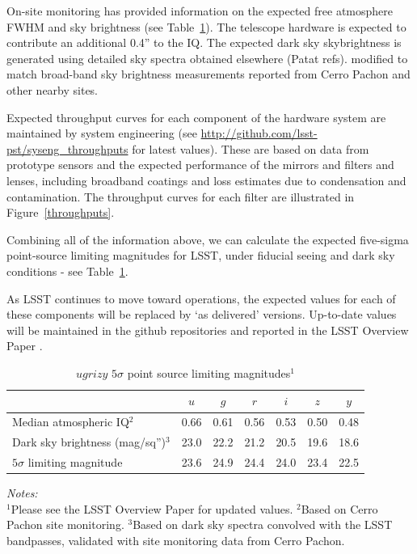 \documentclass{iau}
\begin{document}
On-site monitoring has provided information on the expected free
atmosphere FWHM and sky brightness (see Table~\ref{table2}). The
telescope hardware is expected to contribute an additional 0.4'' to
the IQ. The expected dark sky skybrightness is generated using
detailed sky spectra obtained elsewhere (Patat refs). modified to
match broad-band sky brightness measurements reported from Cerro
Pachon and other nearby sites.

Expected throughput curves for each component of the hardware system
are maintained by system engineering (see
\url{http://github.com/lsst-pst/syseng_throughputs} for latest
values).  These are based on data from prototype sensors and the
expected performance of the mirrors and filters and lenses, including
broadband coatings and loss estimates due to condensation and
contamination. The throughput curves for each filter are illustrated
in Figure~\ref{throughputs}.

Combining all of the information above, we can calculate the
expected five-sigma point-source limiting magnitudes for LSST, under
fiducial seeing and dark sky conditions - see Table~\ref{table2}.

As LSST continues to move toward operations, the expected values for each
of these components will be replaced by `as delivered'
versions. Up-to-date values will be maintained in the github
repositories and reported in the LSST Overview Paper \cite{overviewpaper}.

\begin{table}[tbh]
\begin{center}
\caption{$ugrizy$ $5\sigma$ point source limiting magnitudes$^1$}
\label{table2}
 {\scriptsize
  \begin{tabular}{|l|c|c|c|c|c|c|}\hline
 & $u$ & $g$ & $r$ & $i$ & $z$ & $y$ \\ \hline
Median atmospheric IQ$^2$  & 0.66 & 0.61 & 0.56 & 0.53 & 0.50 & 0.48 \\
    \hline
Dark sky brightness (mag/sq'')$^3$ & 23.0 & 22.2 &  21.2 & 20.5 & 19.6 & 18.6
    \\ \hline
$5\sigma$ limiting magnitude & 23.6 & 24.9 & 24.4 & 24.0 & 23.4 & 22.5
    \\ \hline
 \end{tabular}
  }
 \end{center}
\vspace{1mm}
 \scriptsize{
 {\it Notes:}\\
  $^1$Please see the LSST Overview Paper \cite{overviewpaper} for
  updated values.
  $^2$Based on Cerro Pachon site monitoring.
  $^3$Based on dark sky spectra convolved with the LSST bandpasses,
  validated with site monitoring data from Cerro Pachon.}
\end{table}
\end{document}
